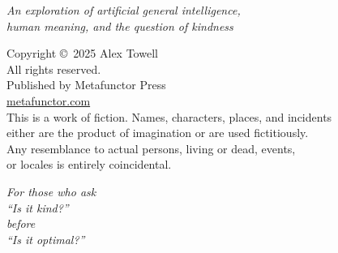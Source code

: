 \documentclass[11pt,twoside]{book}
\makeatletter
\def\cleardoublepage{\clearpage\if@twoside\ifodd\c@page\else
  \hbox{}\thispagestyle{empty}\newpage\if@twocolumn\hbox{}\newpage\fi\fi\fi}
\makeatother
\begin{document}
\frontmatter
\pagestyle{empty}

\begin{titlepage}
\centering
\vspace*{3in}
{\Large\scshape{}\par}
\vfill
\end{titlepage}

\begin{titlepage}
\centering
\vspace*{2in}
{\Huge\scshape{}\par}
\vspace{0.5in}
{\normalsize\itshape An exploration of artificial general intelligence,\\
human meaning, and the question of kindness\par}
\vspace{2in}
{\Large\scshape{}\par}
\vfill
\end{titlepage}

\clearpage
\thispagestyle{empty}
\vspace*{\fill}
\begin{center}
\small
Copyright \copyright\ 2025 Alex Towell\\
All rights reserved.\\
\vspace{0.3in}
Published by Metafunctor Press\\
\href{https://metafunctor.com}{metafunctor.com}\\
\vspace{0.3in}
This is a work of fiction. Names, characters, places, and incidents\\
either are the product of imagination or are used fictitiously.\\
Any resemblance to actual persons, living or dead, events,\\
or locales is entirely coincidental.\\
\vspace{0.3in}
\end{center}
\vspace*{\fill}
\clearpage

\cleardoublepage
\thispagestyle{empty}
\vspace*{2in}
\begin{center}
\textit{For those who ask\\
``Is it kind?''\\
before\\
``Is it optimal?''}
\end{center}
\clearpage
\end{document}
